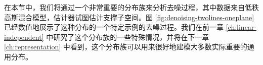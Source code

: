 \documentclass[../../book-main.tex]{subfiles}
\begin{document}

    在本节中，我们将通过一个非常重要的分布族来分析去噪过程，其中数据来自低秩高斯混合模型，估计器试图估计支撑子空间。图 \ref{fig:denoising-twolines-oneplane} 已经数值地展示了这种分布的一个特定示例的去噪过程。我们在前一章 \ref{ch:linear-independent} 中研究了这个分布族的一些特殊情况，并将在下一章 \ref{ch:representation} 中看到，这个分布族可以用来很好地建模大多数实际重要的通用分布。
\end{document}
